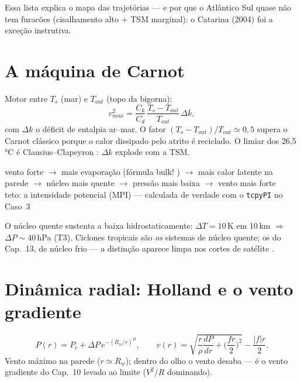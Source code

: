 \documentclass[11pt]{article}
\begin{document}
Essa lista explica o mapa das trajetórias — e por que o Atlântico Sul
quase não tem furacões (cisalhamento alto $+$ TSM marginal): o
Catarina (2004) foi a exceção instrutiva.

\section{A máquina de Carnot}\label{sec:carnot}


\begin{formadif}
Motor entre $T_s$ (mar) e $T_{out}$ (topo da bigorna):
\[ v_{max}^2 = \frac{C_k}{C_d}\,
\frac{T_s - T_{out}}{T_{out}}\,\Delta k, \]
com $\Delta k$ o déficit de entalpia ar--mar. O fator
$(T_s{-}T_{out})/T_{out} \simeq 0{,}5$ supera o Carnot clássico porque
o calor dissipado pelo atrito é reciclado. O limiar dos 26{,}5\,°C é
Clausius--Clapeyron : $\Delta k$ explode com a TSM.
\end{formadif}

\begin{noquadro}
vento forte $\to$ mais evaporação (fórmula bulk!
) $\to$ mais calor latente na parede $\to$
núcleo mais quente $\to$ pressão mais baixa
 $\to$ vento mais forte\\[2pt]
teto: a intensidade potencial (MPI) — calculada de verdade com o
\texttt{tcpyPI} no Caso~3
\end{noquadro}

O núcleo quente sustenta a baixa hidrostaticamente:
$\Delta T = 10$\,K em 10\,km $\Rightarrow$ $\Delta P \sim 40$\,hPa
(T3). Ciclones tropicais são \emph{os} sistemas de núcleo quente; os
do Cap.~13, de núcleo frio — a distinção aparece limpa nos cortes de
satélite .

\section{Dinâmica radial: Holland e o vento gradiente}
\label{sec:dinamica}

\begin{formadif}
\[ P(r) = P_c + \Delta P\,e^{-(R_w/r)^B},\qquad
v(r) = \sqrt{\frac{r}{\rho}\frac{dP}{dr} + \Big(\frac{fr}{2}\Big)^2}
- \frac{|f|r}{2}. \]
Vento máximo na parede ($r \simeq R_w$); dentro do olho o vento
desaba — é o vento gradiente do Cap.~10 
levado ao limite ($V^2/R$ dominando).
\end{formadif}
\end{document}
